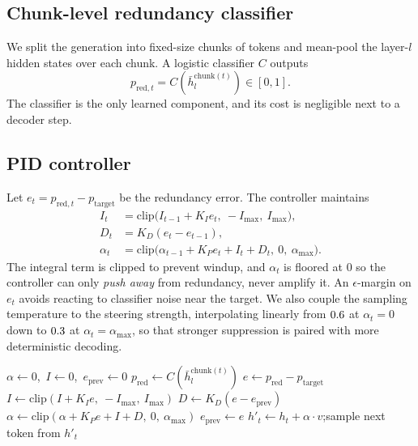 \documentclass[11pt]{article}
\begin{document}
\subsection{Chunk-level redundancy classifier}

We split the generation into fixed-size chunks of \ChunkSize{} tokens and
mean-pool the layer-$l$ hidden states over each chunk. A logistic classifier $C$
outputs
\[
p_{\text{red},t} = C(\bar h_l^{\text{chunk}(t)}) \in [0,1].
\]
The classifier is the only learned component, and its cost is negligible next to
a decoder step.

\subsection{PID controller}

Let $e_t = p_{\text{red},t} - p_{\text{target}}$ be the redundancy error. The
controller maintains
\begin{align*}
I_t &= \mathrm{clip}\bigl(I_{t-1} + K_I e_t,\ -I_{\max},\ I_{\max}\bigr), \\
D_t &= K_D (e_t - e_{t-1}), \\
\alpha_t &= \mathrm{clip}\bigl(\alpha_{t-1} + K_P e_t + I_t + D_t,\ 0,\ \alpha_{\max}\bigr).
\end{align*}
The integral term is clipped to prevent windup, and $\alpha_t$ is floored at $0$
so the controller can only \emph{push away} from redundancy, never amplify it.
An $\epsilon$-margin on $e_t$ avoids reacting to classifier noise near the
target. We also couple the sampling temperature to the steering strength,
interpolating linearly from $0.6$ at $\alpha_t = 0$ down to $0.3$ at
$\alpha_t = \alpha_{\max}$, so that stronger suppression is paired with more
deterministic decoding.

\begin{algorithm}
\caption{Closed-loop PID steering at decoding time}
\begin{algorithmic}[1]
\State $\alpha \gets 0$,\ $I \gets 0$,\ $e_{\text{prev}} \gets 0$
    \State $p_{\text{red}} \gets C(\bar h_l^{\text{chunk}(t)})$
    \State $e \gets p_{\text{red}} - p_{\text{target}}$
      \State $I \gets \mathrm{clip}(I + K_I e,\ -I_{\max},\ I_{\max})$
      \State $D \gets K_D (e - e_{\text{prev}})$
      \State $\alpha \gets \mathrm{clip}(\alpha + K_P e + I + D,\ 0,\ \alpha_{\max})$
    \EndIf
    \State $e_{\text{prev}} \gets e$
  \EndIf
  \State $h'_t \gets h_t + \alpha \cdot v$;\quad sample next token from $h'_t$
\EndFor
\end{algorithmic}
\end{algorithm}
\end{document}
